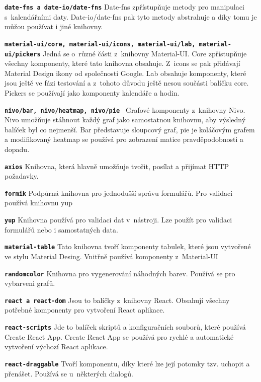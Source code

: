 \begin{DESCRIPTION}
\item \texttt{\textbf{date-fns a date-io/date-fns}} Date-fns zpřístupňuje metody pro manipulaci s~kalendářními daty. Date-io/date-fns pak tyto metody abstrahuje a díky tomu je můžou používat i jiné knihovny.
\item \texttt{\textbf{material-ui/core, material-ui/icons, material-ui/lab, material-ui/pickers}} \newline Jedná se o~různé části z~knihovny Material-UI. Core zpřístupňuje všechny komponenty, které tato knihovna obsahuje. Z~icons se pak přidávají Material Design ikony od společnosti Google. Lab obsahuje komponenty, které jsou ještě ve fázi testování a z~tohoto důvodu ještě nesou součásti balíčku core. Pickers se používají jako komponenty kalendáře a hodin.
\item \texttt{\textbf{nivo/bar, nivo/heatmap, nivo/pie }} Grafové komponenty z~knihovny Nivo. Nivo umožňuje stáhnout každý graf jako samostatnou knihovnu, aby výsledný balíček byl co nejmenší. Bar představuje sloupcový graf, pie je koláčovým grafem a modifikovaný heatmap se používá pro zobrazení matice pravděpodobnosti a dopadu. 
\item \texttt{\textbf{axios}} Knihovna, která hlavně umožňuje tvořit, posílat a přijímat HTTP požadavky.
\item \texttt{\textbf{formik}} Podpůrná knihovna pro jednodušší správu formulářů. Pro validaci používá knihovnu yup
\item \texttt{\textbf{yup}} Knihovna používá pro validaci dat v~nástroji. Lze použít pro validaci formulářů nebo i samostatných data.
\item \texttt{\textbf{material-table}} Tato knihovna tvoří komponenty tabulek, které jsou vytvořené ve stylu Material Desing. Vnitřně používá komponenty z~Material-UI
\item \texttt{\textbf{randomcolor}} Knihovna pro vygenerování náhodných barev. Používá se pro vybarveni grafů.
\item \texttt{\textbf{react a react-dom}} Jsou to balíčky z~knihovny React. Obsahují všechny potřebné komponenty pro vytvoření React aplikace. 
\item \texttt{\textbf{react-scripts}} Jde to balíček skriptů a konfiguračních souborů, které používá Create React App. Create React App se používá pro rychlé a automatické vytvoření výchozí React aplikace.
\item \texttt{\textbf{react-draggable}} Tvoří komponentu, díky které lze její potomky tzv. uchopit a přenášet. Používá se u~některých dialogů.

\end{DESCRIPTION}

